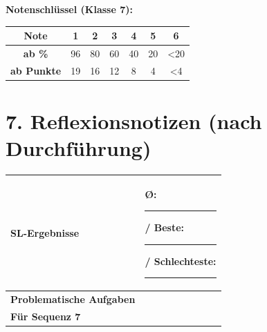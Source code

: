 \documentclass[11pt, a4paper]{article}
\begin{document}
\vspace{1em}

\textbf{Notenschlüssel (Klasse 7):}

\begin{tabular}{|c|c|c|c|c|c|c|}
\hline
\textbf{Note} & 1 & 2 & 3 & 4 & 5 & 6 \\
\hline
\textbf{ab \%} & 96 & 80 & 60 & 40 & 20 & <20 \\
\hline
\textbf{ab Punkte} & 19 & 16 & 12 & 8 & 4 & <4 \\
\hline
\end{tabular}

\section*{7. Reflexionsnotizen (nach Durchführung)}

\begin{tabularx}{\textwidth}{|l|X|}
\hline
\textbf{SL-Ergebnisse} & Ø: \rule{2cm}{0.4pt} / Beste: \rule{1cm}{0.4pt} / Schlechteste: \rule{1cm}{0.4pt} \\[1.5em]
\hline
\textbf{Problematische Aufgaben} & \\[2em]
\hline
\textbf{Für Sequenz 7} & \\[2em]
\hline
\end{tabularx}
\end{document}
